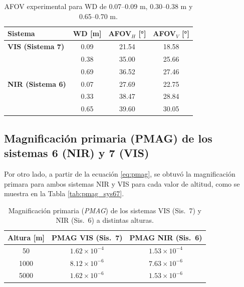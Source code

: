      \begin{table}[H]
       \centering
       \caption{AFOV experimental para WD de 0.07–0.09 m, 0.30–0.38 m y 0.65–0.70 m.}
       \label{tab:afov_exp}
       \begin{tabular}{lccc}
         \toprule
         Sistema & WD [m] & AFOV$_H$ [°] & AFOV$_V$ [°] \\
         \midrule
         \textbf{VIS (Sistema 7)} 
           & 0.09 & 21.54 & 18.58 \\
           & 0.38 & 35.00 & 25.66 \\
           & 0.69 & 36.52 & 27.46 \\
         \midrule
         \textbf{NIR (Sistema 6)} 
           & 0.07 & 27.69 & 22.75 \\
           & 0.33 & 38.47 & 28.84 \\
           & 0.65 & 39.60 & 30.05 \\
         \bottomrule
       \end{tabular}
     \end{table}
    
    \subsection{Magnificación primaria (PMAG) de los sistemas 6 (NIR) y 7 (VIS)}
    \label{sec:pmag}

    Por otro lado, a partir de la ecuación \ref{eq:pmag}, se obtuvó la magnificación primara para ambos sistemas NIR y VIS para cada valor de altitud, como se muestra en la Tabla \ref{tab:pmag_sys67}.

    \begin{table}[h]
      \centering
      \caption{Magnificación primaria (\textit{PMAG}) de los sistemas VIS (Sis.~7) y NIR (Sis.~6) a distintas alturas.}
      \label{tab:pmag}
      \begin{tabular}{|c|c|c|}
          \hline
          \rowcolor[HTML]{EFEFEF}
          \textbf{Altura [m]} & \textbf{PMAG VIS (Sis.~7)} & \textbf{PMAG NIR (Sis.~6)} \\
          \hline
          50   & $1.62\times10^{-4}$ & $1.53\times10^{-4}$ \\
          1000 & $8.12\times10^{-6}$ & $7.63\times10^{-6}$ \\
          5000 & $1.62\times10^{-6}$ & $1.53\times10^{-6}$ \\
          \hline
      \end{tabular}
    \end{table}
  

